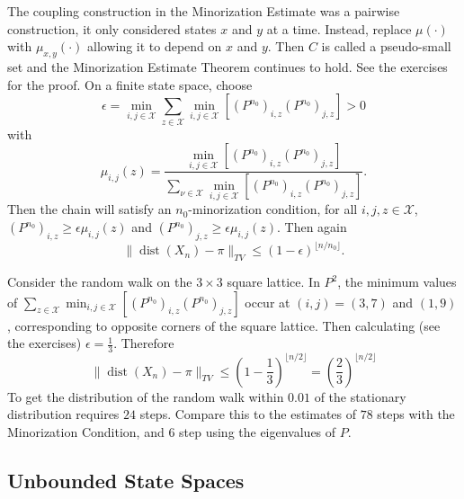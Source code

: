 \documentclass[12pt]{article}
\begin{document}
The coupling construction in the Minorization Estimate was a pairwise
construction, it only considered states \( x \) and \( y \) at a time.
Instead, replace \( \mu(\cdot) \) with \( \mu_{x,y}(\cdot) \) allowing
it to depend on \( x \) and \( y \).  Then \( C \) is called a
pseudo-small set and the Minorization Estimate Theorem continues to
hold.  See the exercises for the proof.  On a finite state space, choose
\[
    \epsilon = \min_{i,j \in \mathcal{X}}\sum_{z \in \mathcal{X}} \min_{i,j
    \in \mathcal{X}} \left[ (P^{n_0})_{i,z} (P^{n_0})_{j,z} \right] > 0
\] with
\[
    \mu_{i,j}(z) = \frac{\min_{i,j \in \mathcal{X}} \left[ (P^{n_0})_{i,z}
    (P^{n_0})_{j,z} \right]}{\sum_{\nu \in \mathcal{X}} \min_{i,j \in
    \mathcal{X}} \left[ (P^{n_0})_{i,z} (P^{n_0})_{j,z} \right] }.
\] Then the chain will satisfy an \( n_0 \)-minorization condition, for
all \( i,j,z \in \mathcal{X} \), \( (P^{n_0})_{i,z} \ge \epsilon \mu_{i,j}
(z) \) and \( (P^{n_0})_{j,z} \ge \epsilon \mu_{i,j}(z) \).  Then again
\[
    \|
    \operatorname{dist}
    (X_n) - \pi \|_{TV} \le (1-\epsilon)^{\lfloor n/n_0 \rfloor}.
\]

\begin{example}
    Consider the random walk on the \( 3 \times 3 \) square lattice. In \(
    P^2 \), the minimum values of \( \sum_{z \in \mathcal{X}} \min_{i,j
    \in \mathcal{X}} \left[ (P^{n_0})_{i,z} (P^{n_0})_{j,z} \right] \)
    occur at \( (i,j) = (3,7) \) and \( (1,9) \), corresponding to
    opposite corners of the square lattice.  Then calculating (see the
    exercises) \( \epsilon = \frac{1}{3} \).  Therefore
    \[
        \|
        \operatorname{dist}
        (X_n) - \pi \|_{TV} \le (1-\frac{1}{3})^{\lfloor n/2 \rfloor} =
        \left( \frac{2}{3} \right)^{\lfloor n/2 \rfloor}
    \] To get the distribution of the random walk within \( 0.01 \) of
    the stationary distribution requires \( 24 \) steps.  Compare this
    to the estimates of \( 78 \) steps with the Minorization Condition,
    and \( 6 \) step using the eigenvalues of \( P \).
\end{example}

\subsection*{Unbounded State Spaces}
\end{document}

